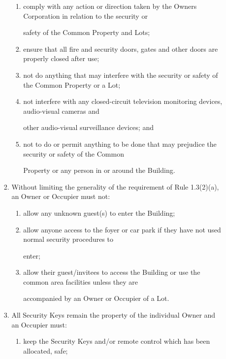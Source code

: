 \documentclass{article}
\begin{document}
\begin{enumerate}[label=\arabic*.]
\begin{enumerate}[label=\arabic{enumi}.\arabic*.]
\begin{enumerate}[label=(\arabic*)]
\begin{enumerate}[label=(\alph*)]
\item  comply with any action or direction taken by the Owners Corporation in relation to the security or 

safety of the Common Property and Lots; 

\item  ensure that all fire and security doors, gates and other doors are properly closed after use; 

\item  not do anything that may interfere with the security or safety of the Common Property or a Lot; 

\item  not interfere with any closed-circuit television monitoring devices, audio-visual cameras and 

other audio-visual surveillance devices; and 

\item  not to do or permit anything to be done that may prejudice the security or safety of the Common 

Property or any person in or around the Building. 

\end{enumerate}
\item  Without limiting the generality of the requirement of Rule 1.3(2)(a), an Owner or Occupier must not: 

\begin{enumerate}[label=(\alph*)]
\item  allow any unknown guest(s) to enter the Building; 

\item  allow anyone access to the foyer or car park if they have not used normal security procedures to 

enter; 

\item  allow their guest/invitees to access the Building or use the common area facilities unless they are 

accompanied by an Owner or Occupier of a Lot. 

\end{enumerate}
\item  All Security Keys remain the property of the individual Owner and an Occupier must: 

\begin{enumerate}[label=(\alph*)]
\item  keep the Security Keys and/or remote control which has been allocated, safe; 


\end{enumerate}
\end{enumerate}
\end{enumerate}
\end{enumerate}
\end{document}

